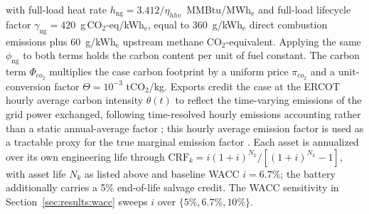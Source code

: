 \documentclass[a4paper,fleqn]{cas-sc}
\begin{document}
with full-load heat rate $h_{\mathrm{ng}}=3.412/\eta_{hhv}$~MMBtu/MWh$_\mathrm{e}$ and full-load lifecycle factor $\gamma_{\mathrm{ng}}=420$~g\,CO$_2$-eq/kWh$_\mathrm{e}$, equal to 360~g/kWh$_\mathrm{e}$ direct combustion emissions plus 60~g/kWh$_\mathrm{e}$ upstream methane CO$_2$-equivalent. Applying the same $\phi_{\mathrm{ng}}$ to both terms holds the carbon content per unit of fuel constant. The carbon term $\Phi_{co_2}$ multiplies the case carbon footprint by a uniform price $\pi_{co_2}$ and a unit-conversion factor $\Theta=10^{-3}$ tCO$_2$/kg. Exports credit the case at the ERCOT hourly average carbon intensity $\theta(t)$ to reflect the time-varying emissions of the grid power exchanged, following time-resolved hourly emissions accounting rather than a static annual-average factor \citep{li2025ghgDemand}; this hourly average emission factor is used as a tractable proxy for the true marginal emission factor \citep{hawkes2010marginal,silerEvans2013regional}. Each asset is annualized over its own engineering life through $\mathrm{CRF}_k=i(1+i)^{N_k}/[(1+i)^{N_k}-1]$, with asset life $N_k$ as listed above and baseline WACC $i=6.7\%$; the battery additionally carries a 5\% end-of-life salvage credit. The WACC sensitivity in Section~\ref{sec:results:wacc} sweeps $i$ over $\{5\%, 6.7\%, 10\%\}$.
\end{document}

